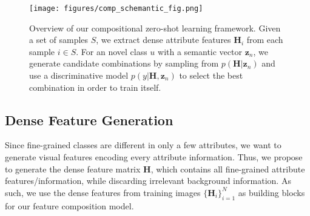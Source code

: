 \documentclass[10pt,journal,compsoc]{IEEEtran}
\newcommand{\z}{\boldsymbol{z}}
\renewcommand{\H}{\boldsymbol{H}}
\newcommand{\1}{\boldsymbol{1}}
\newcommand{\0}{\boldsymbol{0}}
\newcommand{\<}{\langle}
\renewcommand{\>}{\rangle}
\begin{document}
\begin{figure*}[t]
\centering
\texttt{[image: figures/comp\_schemantic\_fig.png]}
\vspace{-0mm}
\caption{
\small{
Overview of our compositional zero-shot learning framework. Given a set of samples $S$, we extract dense attribute features $\H_i$ from each sample $i\in S$. For an novel class $u$ with a semantic vector $\z_n$, we generate candidate combinations by sampling from $p(\H|\z_n)$ and use a discriminative model $p(y|\H,\z_n)$ to select the best combination in order to train itself.
}
}

\label{fig:comp_schemantic_fig}
\end{figure*}


\subsection{Dense Feature Generation}
\label{sec:dense_feature_generation}
Since fine-grained classes are different in only a few attributes, we want to generate visual features encoding every attribute information. Thus, we propose to generate the dense feature matrix $\H$, which contains all fine-grained attribute features/information, while discarding irrelevant background information. As such, we use the dense features from training images $\{\H_i\}^N_{i=1}$ as building blocks for our feature composition model.
\end{document}
